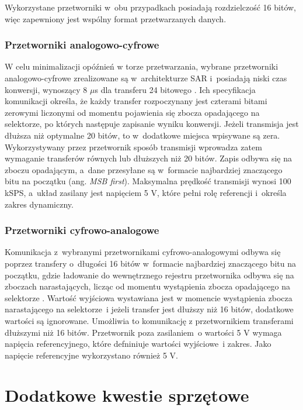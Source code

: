 Wykorzystane przetworniki w~obu przypadkach posiadają rozdzielczość 16 bitów,
więc zapewniony jest wspólny format przetwarzanych danych.

\subsubsection{Przetworniki analogowo-cyfrowe}

W celu minimalizacji opóźnień w torze przetwarzania, wybrane przetworniki
analogowo-cyfrowe zrealizowane są w~architekturze SAR i~posiadają niski czas
konwersji, wynoszący 8 $\mu$s dla transferu 24 bitowego \cite{bib:ad7680}. Ich
specyfikacja komunikacji określa, że każdy transfer rozpoczynany jest czterami
bitami zerowymi liczonymi od momentu pojawienia się zbocza opadającego na
selektorze, po których następuje zapisanie wyniku konwersji. Jeżeli transmisja
jest dłuższa niż optymalne 20 bitów, to w~dodatkowe miejsca wpisywane są zera.
Wykorzystywany przez przetwornik sposób transmisji wprowadza zatem wymaganie
transferów równych lub dłuższych niż 20 bitów. Zapis odbywa się na zboczu
opadającym, a~dane przesyłane są w~formacie najbardziej znaczącego bitu na
początku (ang. \textit{MSB first}). Maksymalna prędkość transmisji wynosi 100
kSPS, a~układ zasilany jest napięciem 5 V, które pełni rolę referencji i~określa
zakres dynamiczny.

\subsubsection{Przetworniki cyfrowo-analogowe}

Komunikacja z~wybranymi przetwornikami cyfrowo-analogowymi odbywa się poprzez
transfery o~długości 16 bitów w~formacie najbardziej znaczącego bitu na
początku, gdzie ładowanie do wewnętrznego rejestru przetwornika odbywa się na
zboczach narastających, licząc od momentu wystąpienia zbocza opadającego na
selektorze \cite{bib:ad5541}. Wartość wyjściowa wystawiana jest w momencie
wystąpienia zbocza narastającego na selektorze~i jeżeli transfer jest dłuższy
niż 16 bitów, dodatkowe wartości są ignorowane. Umożliwia to komunikację z
przetwornikiem transferami dłuższymi niż 16 bitów. Przetwornik poza zasilaniem~o
wartości 5 V wymaga napięcia referencyjnego, które defniniuje wartości
wyjściowe~i zakres. Jako napięcie referencyjne wykorzystano również 5 V. 

\section{Dodatkowe kwestie sprzętowe}

